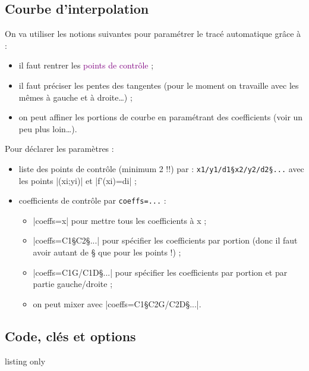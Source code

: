 \documentclass[a4paper,french,11pt]{article}
\newcommand\ctex[1]{\tcbox[vignettelatex]{#1}}
\begin{document}
\subsection{Courbe d'interpolation}

\begin{noteblock}
On va utiliser les notions suivantes pour paramétrer le tracé \og automatique \fg{} grâce à  \ctex{..controls} :
%
\begin{itemize}
	\item il faut rentrer les \textcolor{purple}{\textsf{points de contrôle}} ;
	\item il faut préciser les \textcolor{CouleurVertForet}{\textsf{pentes des tangentes}} (pour le moment on travaille avec les mêmes à gauche et à droite\ldots) ;
	\item on peut \og affiner \fg{} les portions de courbe en paramétrant des \textcolor{BleuCadet}{\textsf{coefficients}} (voir un peu plus loin\ldots).
\end{itemize}

\medskip

Pour déclarer les paramètres :
%
\begin{itemize}
	\item liste des points de contrôle (minimum 2 !!) par : \verb|x1/y1/d1§x2/y2/d2§...| avec les points \pverb|(xi;yi)| et \vverb|f'(xi)=di| ;
	\item coefficients de contrôle par \verb|coeffs=...| :
	\begin{itemize}
		\item \averb|coeffs=x| pour mettre tous les coefficients à x ;
		\item \averb|coeffs=C1§C2§...| pour spécifier les coefficients par portion (donc il faut avoir autant de § que pour les points !) ;
		\item \averb|coeffs=C1G/C1D§...| pour spécifier les coefficients par portion et par partie gauche/droite ;
		\item on peut mixer avec \averb|coeffs=C1§C2G/C2D§...|.
	\end{itemize}
\end{itemize}
\vspace*{-\baselineskip}\leavevmode
\end{noteblock}

\subsection{Code, clés et options}

\begin{PresCodeTexPL}{listing only}
\end{PresCodeTexPL}
\end{document}
